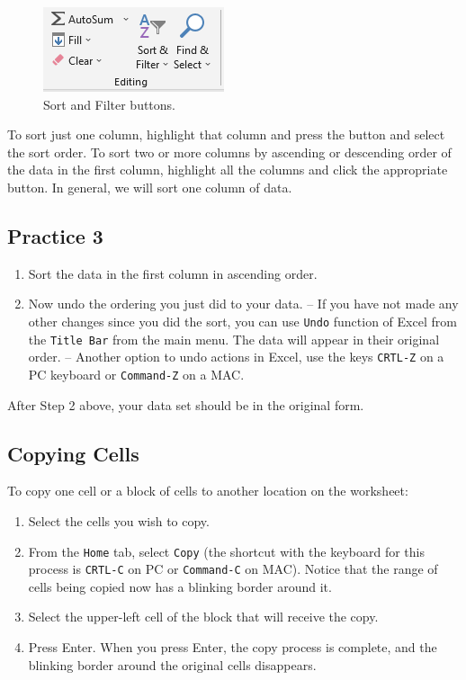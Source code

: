 \documentclass[
]{book}
\providecommand{\tightlist}{%
  \setlength{\itemsep}{0pt}\setlength{\parskip}{0pt}}
\begin{document}
\begin{figure}

{\centering \includegraphics[width=0.3\linewidth]{sorting} 

}

\caption{Sort and Filter buttons.}\label{fig:sorting}
\end{figure}

To sort just one column, highlight that column and press the button and select the sort order. To sort two or more columns by ascending or descending order of the data in the first column, highlight all the columns and click the appropriate button. In general, we will sort one column of data.

\hypertarget{practice-3}{%
\subsection{Practice 3}\label{practice-3}}

\begin{enumerate}
\def\labelenumi{\arabic{enumi}.}
\tightlist
\item
  Sort the data in the first column in ascending order.
\item
  Now undo the ordering you just did to your data.
  -- If you have not made any other changes since you did the sort, you can use \texttt{Undo} function of Excel from the \texttt{Title\ Bar} from the main menu. The data will appear in their original order.
  -- Another option to undo actions in Excel, use the keys \texttt{CRTL-Z} on a PC keyboard or \texttt{Command-Z} on a MAC.
\end{enumerate}

After Step 2 above, your data set should be in the original form.

\hypertarget{copying-cells}{%
\subsection{Copying Cells}\label{copying-cells}}

To copy one cell or a block of cells to another location on the worksheet:

\begin{enumerate}
\def\labelenumi{\arabic{enumi}.}
\tightlist
\item
  Select the cells you wish to copy.
\item
  From the \texttt{Home} tab, select \texttt{Copy} (the shortcut with the keyboard for this process is \texttt{CRTL-C} on PC or \texttt{Command-C} on MAC). Notice that the range of cells being copied now has a blinking border around it.
\item
  Select the upper-left cell of the block that will receive the copy.
\item
  Press Enter. When you press Enter, the copy process is complete, and the blinking border around the original cells disappears.
\end{enumerate}
\end{document}
